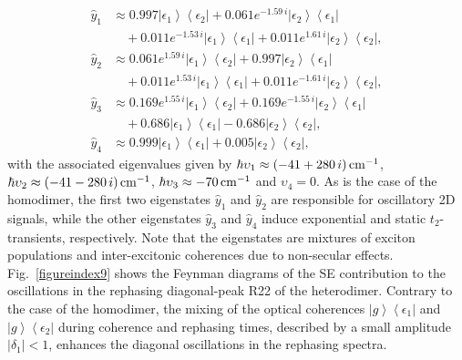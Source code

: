 \documentclass[%
 reprint,%
 amssymb, amsmath,%
 aip,cha,%
]{revtex4-1}
\newcommand{\bra}[1]{\ensuremath{\left\langle{#1}\right\vert}}
\newcommand{\ket}[1]{\ensuremath{\left|{#1}\right\rangle}}
\newcommand{\abs}[1]{\left|#1\right|}
\begin{document}
\begin{align}
\hat{y}_{1}
&\approx 0.997\ket{\epsilon_1}\bra{\epsilon_2}+0.061 e^{-1.59\,i}\ket{\epsilon_2}\bra{\epsilon_1}\label{eq:yhetero1}\\
&\quad+0.011 e^{-1.53\,i}\ket{\epsilon_1}\bra{\epsilon_1}+0.011 e^{1.61\,i}\ket{\epsilon_2}\bra{\epsilon_2},\nonumber\\
\hat{y}_{2}
&\approx 0.061 e^{1.59\,i}\ket{\epsilon_1}\bra{\epsilon_2}+0.997\ket{\epsilon_2}\bra{\epsilon_1}\label{eq:yhetero2}\\
&\quad+0.011 e^{1.53\,i}\ket{\epsilon_1}\bra{\epsilon_1}+0.011 e^{-1.61\,i}\ket{\epsilon_2}\bra{\epsilon_2},\nonumber\\
\hat{y}_{3}
&\approx 0.169 e^{1.55\,i}\ket{\epsilon_1}\bra{\epsilon_2}+0.169 e^{-1.55\,i}\ket{\epsilon_2}\bra{\epsilon_1}\\
&\quad+0.686\ket{\epsilon_1}\bra{\epsilon_1}-0.686\ket{\epsilon_2}\bra{\epsilon_2},\nonumber\\
\hat{y}_{4}
&\approx 0.999\ket{\epsilon_1}\bra{\epsilon_1}+0.005\ket{\epsilon_2}\bra{\epsilon_2},
\end{align}
with the associated eigenvalues given by $\hbar\upsilon_1\approx (-41+280\,i)\,{\rm cm}^{-1}$, $\hbar\upsilon_2\approx (-41-280\,i)\,{\rm cm}^{-1}$, $\hbar\upsilon_3\approx -70\,{\rm cm}^{-1}$ and $\upsilon_4=0$. As is the case of the homodimer, the first two eigenstates $\hat{y}_1$ and $\hat{y}_2$ are responsible for oscillatory 2D signals, while the other eigenstates $\hat{y}_3$ and $\hat{y}_4$ induce exponential and static $t_2$-transients, respectively. Note that the eigenstates are mixtures of exciton populations and inter-excitonic coherences due to non-secular effects. Fig.~\ref{figureindex9} shows the Feynman diagrams of the SE contribution to the oscillations in the rephasing diagonal-peak R22 of the heterodimer. Contrary to the case of the homodimer, the mixing of the optical coherences $\ket{g}\bra{\epsilon_1}$ and $\ket{g}\bra{\epsilon_2}$ during coherence and rephasing times, described by a small amplitude $\abs{\delta_1}<1$, enhances the diagonal oscillations in the rephasing spectra.

\end{document}
